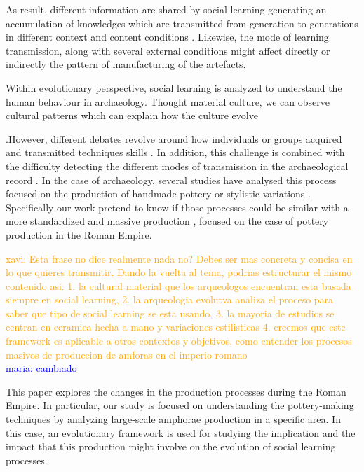 \documentclass[review]{elsarticle}
\newcommand{\memo}[2]{\textcolor{#1}{#2}}
\newcommand{\xavi}[1]{\memo{orange}{xavi: #1\\}}
\newcommand{\maria}[1]{\memo{blue}{maria: #1\\}}
\begin{document}



As result, different information are shared by social learning generating an accumulation of knowledges which are transmitted from generation to generations in different context and content conditions  \citep{eerkens_jelmer_cultural_2005, neff1992ceramics,henrich_evolution_2003, boyd_cultural_2011}. Likewise, the mode of learning transmission, along with several external conditions might affect directly or indirectly the pattern of manufacturing of the artefacts.

Within evolutionary perspective, social learning is analyzed to understand the human behaviour in archaeology. Thought material culture, we can observe cultural patterns which can explain how the culture evolve \citep{richerson2005not}


.However, different debates revolve around how individuals or groups acquired and transmitted techniques skills  \citep{bowser_learning_2008, mesoudi_cultural_2008}. In addition, this challenge is combined with the difficulty detecting the different modes of transmission in the archaeological record \citep{roux_standardization_2015}. In the case of archaeology, several studies have analysed this process focused on the production of handmade pottery \citep{steele_james_ceramic_2010} or stylistic variations \citep{neiman_stylistic_1995, shennan_ceramic_2001}. Specifically our work pretend to know if those processes could be similar with a more standardized and massive production \citep{gandon_copying_2014}, focused on the case of pottery production in the Roman Empire. 


\xavi{Esta frase no dice realmente nada no? Debes ser mas concreta y concisa en lo que quieres transmitir. Dando la vuelta al tema, podrias estructurar el mismo contenido asi: 1. la cultural material que los arqueologos encuentran esta basada siempre en social learning, 2. la arqueologia evolutva analiza el proceso para saber que tipo de social learning se esta usando, 3. la mayoria de estudios se centran en ceramica hecha a mano y variaciones estilisticas 4. creemos que este framework es aplicable a otros contextos y objetivos, como entender los procesos masivos de produccion de amforas en el imperio romano}
\maria{cambiado}

                       
This paper explores the changes in the production processes during the Roman Empire. In particular, our study is focused on understanding the pottery-making techniques by analyzing large-scale amphorae production in a specific  area. In this case, an evolutionary framework is used for studying the implication and the impact that this production might involve on the  evolution of social learning processes.  
\end{document}
